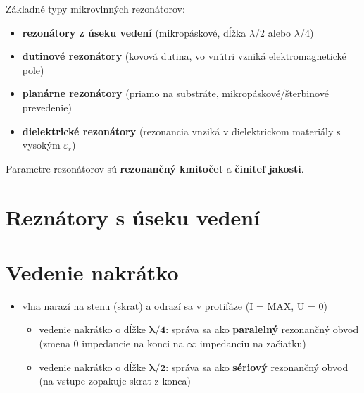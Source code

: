 	Základné typy mikrovlnných rezonátorov:
	\begin{itemize}[label=--]
		\item \textbf{rezonátory z úseku vedení} (mikropáskové, dĺžka $\lambda$/2 alebo $\lambda$/4)
		\item \textbf{dutinové rezonátory} (kovová dutina, vo vnútri vzniká elektromagnetické pole) 
		\item \textbf{planárne rezonátory} (priamo na substráte, mikropáskové/šterbinové prevedenie)
		\item \textbf{dielektrické rezonátory} (rezonancia vnziká v dielektrickom materiály s vysokým $\varepsilon_r$)
	\end{itemize}
	Parametre rezonátorov sú \textbf{rezonančný kmitočet} a \textbf{činiteľ jakosti}. 
	
	\section{Reznátory s úseku vedení} \label{rez:usek_vedeni}
	\section{Vedenie nakrátko}
		\begin{itemize}[label=--]
		\item vlna narazí na stenu (skrat) a odrazí sa v protifáze (I = MAX, U = 0)
			\begin{itemize}[label=$\rightarrow$]
			\item vedenie nakrátko o dĺžke $\mathbf{\lambda/4}$: správa sa ako \textbf{paralelný} rezonančný obvod (zmena 0 impedancie na konci na $\infty$ impedanciu na začiatku)
			\item vedenie nakrátko o dĺžke $\mathbf{\lambda/2}$: správa sa ako \textbf{sériový} rezonančný obvod (na vstupe zopakuje skrat z konca)
		\end{itemize}
	\end{itemize}
	
